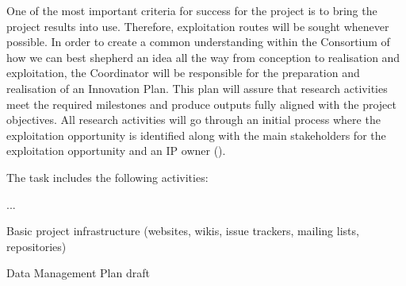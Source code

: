 \begin{workpackage}[id=management,type=MGT,wphases=0-36!.2,
  title=Project Management,
  short=Management,
  lead=SRL,
  swsites
]
\begin{tasklist}
\begin{task}[
  title=Innovation Management,
  id=innovation-management,
  lead=SRL,
  PM=6,
  wphases={0-36!.2},
  partners={MP,QS,UIO,IFR}
]
One of the most important criteria for success for the \TheProject project is to bring the project results into use. Therefore, exploitation routes will be sought whenever possible. In order to create a common understanding within the Consortium of how we can best shepherd an idea all the way from conception to realisation and exploitation, the Coordinator will be responsible for the preparation and realisation of an Innovation Plan. This plan will assure that research activities meet the required milestones and produce outputs fully aligned with the project objectives. All research activities will go through an initial process where the exploitation opportunity is identified along with the main stakeholders for the exploitation opportunity and an IP owner
().
\end{task}

\begin{task}[
  title=Community Engagement Panel,
  id=communikty-panel,
  lead=SRL,
  PM=24,
  wphases={0-36!.5},
  partners={MP,QS,UIO,IFR},
]
The task includes the following activities:
\begin{compactenum}
\item {} ...
\end{compactenum}
\end{task}

\end{tasklist}


\begin{wpdelivs}


\begin{wpdeliv}[due=1,miles=startup,id=infrastructure,dissem=PU,nature=DEC,lead=SRL]
  {Basic project infrastructure (websites, wikis, issue trackers, mailing lists, repositories)}
\end{wpdeliv}

\begin{wpdeliv}[due=9,miles=startup,id=data-management-plan-draft,dissem=PU,nature=R,lead=SRL]
  {Data Management Plan draft}
\end{wpdeliv}


\end{wpdelivs}
\end{workpackage}
